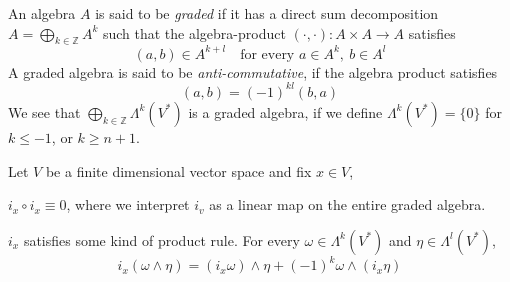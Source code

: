 \documentclass[../main-v2-manifolds.tex]{subfiles}
\begin{document}
\begin{definition}
    An algebra $A$ is said to be \emph{graded} if it has a direct sum decomposition $A = \bigoplus_{k\in \mathbb{Z}}A^k$ such that the algebra-product $(\cdot,\cdot): A\times A\to A$ satisfies 
    \[
        (a,b)\in A^{k+l}\quad\text{for every }a\in A^k,\: b\in A^l
    \]
    A graded algebra is said to be \emph{anti-commutative}, if the algebra product satisfies
    \[
        (a,b) = (-1)^{kl}(b,a)
    \]
    We see that $\bigoplus_{k\in \mathbb{Z}}\Lambda^k(V^*)$ is a graded algebra, if we define $\Lambda^k(V^*)=\{0\}$ for $k\leq -1$, or $k\geq n+1$. 

\end{definition}

\begin{wts}
    Let $V$ be a finite dimensional vector space and fix $x\in V$,
    \begin{enumroman}
        \item $i_x\circ i_x\equiv 0$, where we interpret $i_v$ as a linear map on the entire graded algebra.
        \item $i_x$ satisfies some kind of product rule. For every $\omega\in \Lambda^k(V^*)$ and $\eta\in\Lambda^l(V^*)$,
        \[
            i_x(\omega\wedge\eta) = (i_x\omega)\wedge\eta + (-1)^{k}\omega\wedge(i_x\eta)
        \]
    \end{enumroman}
\end{wts}
\end{document}
